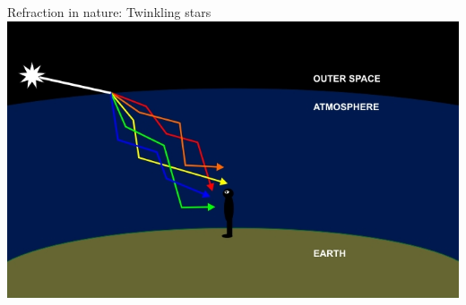 \begin{frame}{Refraction in nature: Twinkling stars}
  \includegraphics[width=\textwidth]{media/twinkle.jpg}
\end{frame}

